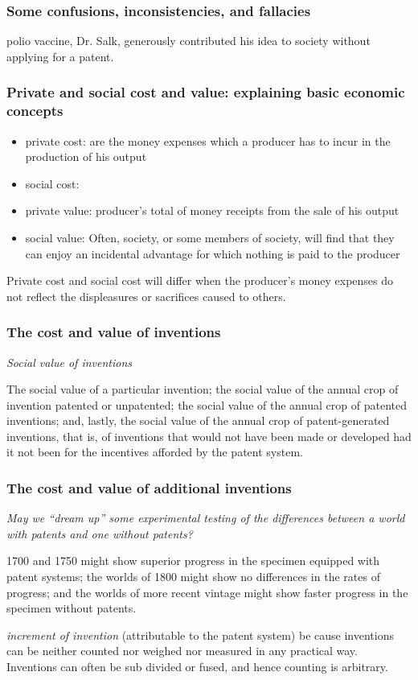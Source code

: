 \begin{frame}
\frametitle{Some confusions, inconsistencies, and fallacies}
polio vaccine, Dr. Salk, generously contributed his idea to society without applying for a patent.
\end{frame}


\begin{frame}
\frametitle{Private and social cost and value: explaining basic economic concepts}
\begin{itemize}
	\item private cost: are the money expenses which a producer has to incur in the production of his output
    \item social cost: 
    \item private value: producer's total of money receipts from the sale of his output
    \item social value: Often, society, or some members of society, will find that they can enjoy an incidental advantage for which nothing is paid to the producer
\end{itemize}
Private cost and social cost will differ when the producer’s money expenses do not reflect the displeasures or sacrifices caused to others.
\end{frame}


\begin{frame}
\frametitle{The cost and value of inventions}
\textit{Social value of inventions}

The social value of a particular invention; the social value of the annual crop of invention patented or unpatented; the social value of the annual crop of patented inventions; and, lastly, the social value of the annual crop of patent-generated inventions, that is, of inventions that would not have been made or developed had it not been for the incentives afforded by the patent system.
\end{frame}

\begin{frame}
\frametitle{The cost and value of additional inventions}
\textit{May we “dream up” some experimental testing of the differences between a world with patents and one without patents?}

1700 and 1750 might show superior progress in the specimen equipped with patent systems; the worlds of 1800 might show no differences in the rates of progress; and the worlds of more recent vintage might show faster progress in the specimen without patents.

\textit{increment of invention} (attributable to the patent system) be cause inventions can be neither counted nor weighed nor measured in any practical way. Inventions can often be sub divided or fused, and hence counting is arbitrary.
\end{frame}



